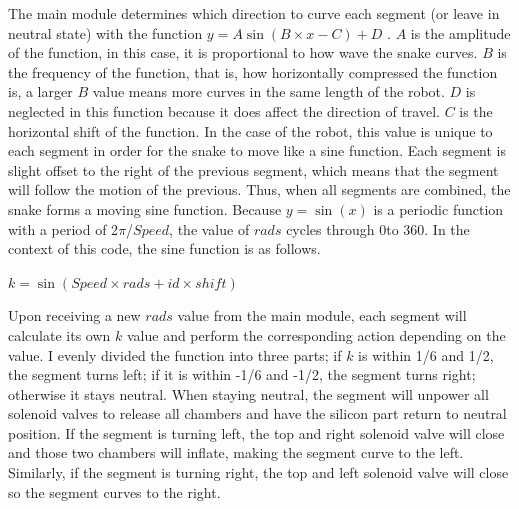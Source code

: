 \documentclass[twoside, 11pt]{article}
\begin{document}
The main module determines which direction to curve each segment (or leave in neutral state) with the function \(y=A\sin(B\times x - C) + D\) \cite{Luo2020Motion, Wan2023Design, Luo2018OriSnake}. \(A\) is the amplitude of the function, in this case, it is proportional to how wave the snake curves. \(B\) is the frequency of the function, that is, how horizontally compressed the function is, a larger \(B\) value means more curves in the same length of the robot. \(D\) is neglected in this function because it does affect the direction of travel. \(C\) is the horizontal shift of the function. In the case of the robot, this value is unique to each segment in order for the snake to move like a sine function. Each segment is slight offset to the right of the previous segment, which means that the segment will follow the motion of the previous. Thus, when all segments are combined, the snake forms a moving sine function. Because \(y=\sin(x)\) is a periodic function with a period of 2\(\pi\)/\(Speed\), the value of \(rads\) cycles through 0\degree to 360\degree . In the context of this code, the sine function is as follows. 

\centerline{\(k = \sin(Speed \times rads + id \times shift)\)}Upon receiving a new \(rads\) value from the main module, each segment will calculate its own \(k\) value and perform the corresponding action depending on the value. I evenly divided the function into three parts; if \(k\) is within 1/6 and 1/2, the segment turns left; if it is within -1/6 and -1/2, the segment turns right; otherwise it stays neutral. When staying neutral, the segment will unpower all solenoid valves to release all chambers and have the silicon part return to neutral position. If the segment is turning left, the top and right solenoid valve will close and those two chambers will inflate, making the segment curve to the left. Similarly, if the segment is turning right, the top and left solenoid valve will close so the segment curves to the right. 
\end{document}
